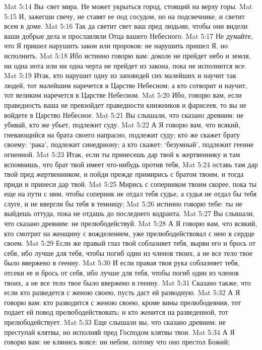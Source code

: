Mat 5:14  Вы--свет мира. Не может укрыться город, стоящий на верху горы.
Mat 5:15  И, зажегши свечу, не ставят ее под сосудом, но на подсвечнике, и светит всем в доме.
Mat 5:16  Так да светит свет ваш пред людьми, чтобы они видели ваши добрые дела и прославляли Отца вашего Небесного.
Mat 5:17  Не думайте, что Я пришел нарушить закон или пророков: не нарушить пришел Я, но исполнить.
Mat 5:18  Ибо истинно говорю вам: доколе не прейдет небо и земля, ни одна иота или ни одна черта не прейдет из закона, пока не исполнится все.
Mat 5:19  Итак, кто нарушит одну из заповедей сих малейших и научит так людей, тот малейшим наречется в Царстве Небесном; а кто сотворит и научит, тот великим наречется в Царстве Небесном.
Mat 5:20  Ибо, говорю вам, если праведность ваша не превзойдет праведности книжников и фарисеев, то вы не войдете в Царство Небесное.
Mat 5:21  Вы слышали, что сказано древним: не убивай, кто же убьет, подлежит суду.
Mat 5:22  А Я говорю вам, что всякий, гневающийся на брата своего напрасно, подлежит суду; кто же скажет брату своему: `рака', подлежит синедриону; а кто скажет: `безумный', подлежит геенне огненной.
Mat 5:23  Итак, если ты принесешь дар твой к жертвеннику и там вспомнишь, что брат твой имеет что-нибудь против тебя,
Mat 5:24  оставь там дар твой пред жертвенником, и пойди прежде примирись с братом твоим, и тогда приди и принеси дар твой.
Mat 5:25  Мирись с соперником твоим скорее, пока ты еще на пути с ним, чтобы соперник не отдал тебя судье, а судья не отдал бы тебя слуге, и не ввергли бы тебя в темницу;
Mat 5:26  истинно говорю тебе: ты не выйдешь оттуда, пока не отдашь до последнего кодранта.
Mat 5:27  Вы слышали, что сказано древним: не прелюбодействуй.
Mat 5:28  А Я говорю вам, что всякий, кто смотрит на женщину с вожделением, уже прелюбодействовал с нею в сердце своем.
Mat 5:29  Если же правый глаз твой соблазняет тебя, вырви его и брось от себя, ибо лучше для тебя, чтобы погиб один из членов твоих, а не все тело твое было ввержено в геенну.
Mat 5:30  И если правая твоя рука соблазняет тебя, отсеки ее и брось от себя, ибо лучше для тебя, чтобы погиб один из членов твоих, а не все тело твое было ввержено в геенну.
Mat 5:31  Сказано также, что если кто разведется с женою своею, пусть даст ей разводную.
Mat 5:32  А Я говорю вам: кто разводится с женою своею, кроме вины прелюбодеяния, тот подает ей повод прелюбодействовать; и кто женится на разведенной, тот прелюбодействует.
Mat 5:33  Еще слышали вы, что сказано древним: не преступай клятвы, но исполняй пред Господом клятвы твои.
Mat 5:34  А Я говорю вам: не клянись вовсе: ни небом, потому что оно престол Божий;
